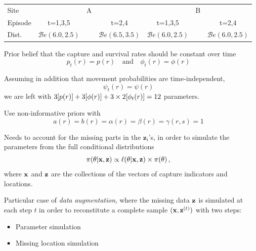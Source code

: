 \begin{slide}
\begin{tabular}{l|ccc|ccc}
\hline
Site  &        & A &  & & B & \\
Episode  & t=1,3,5 & & t=2,4 & t=1,3,5 & & t=2,4 \\
\hline
Dist. & $\mathscr{B}e(6.0,2.5)$ &  & $\mathscr{B}e(6.5,3.5)$ & $\mathscr{B}e(6.0,2.5)$ & & $\mathscr{B} e(6.0,2.5)$ \\
\hline
\end{tabular}
\normalsize

\end{slide}\begin{slide}

Prior belief that the capture and survival rates should be constant over time
$$
p_t(r)=p(r) \quad\text{and}\quad \phi_t(r)=\phi(r)
$$

\vs\pause Assuming in addition that movement probabilities are time-independent,
$$
\psi_t(r) = \psi(r)
$$
we are left with $3[p(r)]+3[\phi(r)]+3\times 2[{{\phi}_t(r)}] = 12$ parameters. 

\vs\pause 
Use non-informative priors with 
$$
a(r)=b(r)=\alpha(r)=\beta(r)=\gamma(r,s)=1
$$ 

\end{slide}\begin{slide}

Needs to account for the missing parts in the $\mathbf{z}_i$'s, in order to simulate
the parameters from the full conditional distributions
$$
\pi(\theta|\mathbf{x},{\bf z}) \propto
\ell(\theta|\mathbf{x},{\bf z})\times \pi(\theta)\,,
$$
where $\mathbf{x}$ and ${\bf z}$ are the collections of the vectors of capture indicators and locations.

\vs\pause Particular case of {\em data augmentation}, where the missing
data ${\bf z}$ is simulated at each step $t$ in order to reconstitute a complete sample $(\mathbf{x},{\bf z}^{(t)})$
with two steps:
\begin{itemize}
\item Parameter simulation
\item Missing location simulation
\end{itemize}

\end{slide}\begin{slide}


\end{slide}
